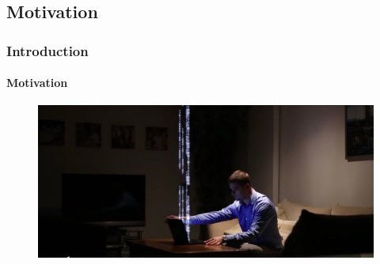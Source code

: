 \documentclass[slidestop,usepdftitle=false]{gvvslides}
\begin{document}
%
\subsection{Motivation}
\begin{frame}
\frametitle{Introduction}
\framesubtitle{Motivation}
\begin{figure}
\includegraphics[width=\columnwidth]{point_example}
\end{figure}
\end{frame}
\end{document}
